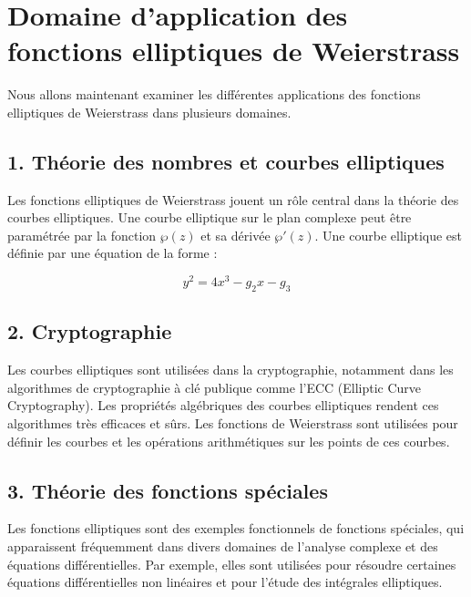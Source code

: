 \documentclass[12pt]{article}
\begin{document}
                        \section{Domaine d'application des fonctions elliptiques de Weierstrass}

                        Nous allons maintenant examiner les différentes applications des fonctions elliptiques de Weierstrass dans plusieurs domaines.

                        \subsection*{1. Théorie des nombres et courbes elliptiques}

                        Les fonctions elliptiques de Weierstrass jouent un rôle central dans la théorie des courbes elliptiques. Une courbe elliptique sur le plan complexe peut être paramétrée par la fonction $\wp(z)$ et sa dérivée $\wp'(z)$. Une courbe elliptique est définie par une équation de la forme :

                        \[
                        y^2 = 4x^3 - g_2 x - g_3
                        \]

                        \subsection*{2. Cryptographie}

                        Les courbes elliptiques sont utilisées dans la cryptographie, notamment dans les algorithmes de cryptographie à clé publique comme l'ECC (Elliptic Curve Cryptography). Les propriétés algébriques des courbes elliptiques rendent ces algorithmes très efficaces et sûrs. Les fonctions de Weierstrass sont utilisées pour définir les courbes et les opérations arithmétiques sur les points de ces courbes.

                        \subsection*{3. Théorie des fonctions spéciales}

                        Les fonctions elliptiques sont des exemples fonctionnels de fonctions spéciales, qui apparaissent fréquemment dans divers domaines de l'analyse complexe et des équations différentielles. Par exemple, elles sont utilisées pour résoudre certaines équations différentielles non linéaires et pour l'étude des intégrales elliptiques.
\end{document}
